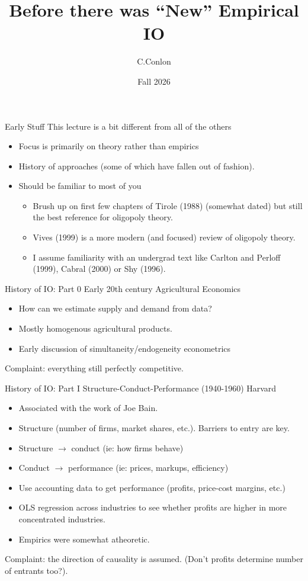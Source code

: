 \documentclass[aspectratio=169,11pt]{beamer}
\title [``Old'' IO]{Before there was ``New'' Empirical IO}
\author{C.Conlon}
\institute{Grad IO }
\date{Fall 2026}
\begin{document}
\begin{frame}
\titlepage
\end{frame}

\begin{frame}{Early Stuff}
This lecture is a bit different from all of the others
\begin{itemize}
\item Focus is primarily on theory rather than empirics
\item History of approaches (some of which have fallen out of fashion).
\item Should be familiar to most of you
\begin{itemize}
\item Brush up on first few chapters of Tirole (1988) (somewhat dated) but still the best reference for oligopoly theory.
\item Vives (1999) is a more modern (and focused) review of oligopoly theory.
\item I assume familiarity with an undergrad text like Carlton and Perloff (1999), Cabral (2000) or Shy (1996).
\end{itemize}
\end{itemize}
\end{frame}

\begin{frame}{History of IO: Part 0}
Early 20th century Agricultural Economics
\begin{itemize}
\item How can we estimate supply and demand from data?
\item Mostly homogenous agricultural products.
\item Early discussion of simultaneity/endogeneity econometrics
\end{itemize}
Complaint: everything still perfectly competitive.
\end{frame}

\begin{frame}{History of IO: Part I}
Structure-Conduct-Performance (1940-1960) Harvard
\begin{itemize}
\item Associated with the work of Joe Bain.
\item Structure (number of firms, market shares, etc.). Barriers to entry are key.
\item Structure $\rightarrow$ conduct (ie: how firms behave)
\item Conduct $\rightarrow$ performance (ie: prices, markups, efficiency)
\item Use accounting data to get performance (profits, price-cost margins, etc.)
\item OLS regression across industries to see whether profits are higher in more concentrated industries.
\item Empirics were somewhat atheoretic.
\end{itemize}
Complaint: the direction of causality is assumed. (Don't profits determine number of entrants too?).
\end{frame}
\end{document}

